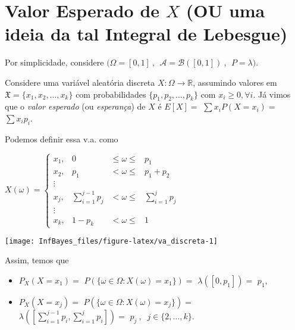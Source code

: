 \documentclass[
]{book}
\begin{document}
\hypertarget{valor-esperado-de-x-ou-uma-ideia-da-tal-integral-de-lebesgue}{%
\section{\texorpdfstring{Valor Esperado de \(X\) (OU uma ideia da tal Integral de Lebesgue)}{Valor Esperado de X (OU uma ideia da tal Integral de Lebesgue)}}\label{valor-esperado-de-x-ou-uma-ideia-da-tal-integral-de-lebesgue}}

Por simplicidade, considere \(\Big(\Omega = [0,1]~,~~ \mathcal{A} = \mathcal{B}\left([0,1]\right)~,~~ P=\lambda\Big)\).

Considere uma variável aleatória discreta \(X: \Omega \longrightarrow \mathbb{R}\), assumindo valores em \(\mathfrak{X}=\{x_1,x_2,\ldots,x_k\}\) com probabilidades \(\{p_1,p_2,\ldots,p_k\}\) com \(x_i \geq 0, \forall i\). Já vimos que o \emph{valor esperado} (ou \emph{esperança}) de \(X\) é \(E[X] =\) \(\sum x_i P(X=x_i) =\) \(\sum x_i p_i\).

Podemos definir essa v.a. como

\(X(\omega) = \left\{\begin{array}{lccc} x_1, & 0 & \leq \omega \leq & p_1 \\  x_2, & p_1 & < \omega \leq & p_1+p_2 \\  \vdots & & & \\  x_j, & \sum_{i=1}^{j-1} p_j & < \omega \leq & \sum_{i=1}^{j} p_j \\  \vdots & & & \\  x_k, & 1-p_k & < \omega \leq& 1 \end{array}\right.\)

\begin{center}\texttt{[image: InfBayes\_files/figure-latex/va\_discreta-1]} \end{center}

Assim, temos que

\begin{itemize}
\item
  \(P_X(X=x_1) =\) \(P\left(\{\omega \in \Omega : X(\omega)=x_1\}\right) =\) \(\lambda\left([0,p_1]\right) =\) \(p_1\),
\item
  \(P_X(X=x_j) =\) \(P\left(\{\omega \in \Omega : X(\omega)=x_j\}\right) =\) \(\lambda\left(\left[\sum_{i=1}^{j-1} p_i,\sum_{i=1}^{j} p_i\right]\right) =\) \(p_j ~,~\) \(j \in \{2,\ldots,k\}\).
\end{itemize}

\(~\)
\end{document}
